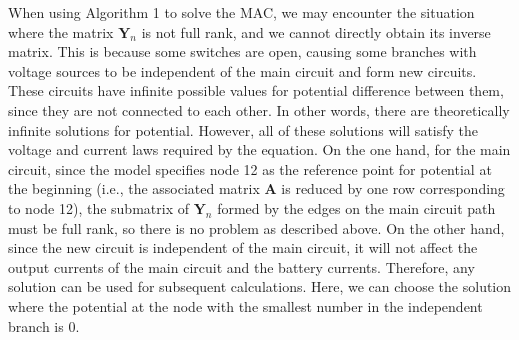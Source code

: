 \documentclass{article}
\begin{document}
When using Algorithm 1 to solve the MAC, we may encounter the situation where the matrix $\bm{Y}_n$ is not full rank, and we cannot directly obtain its inverse matrix.
This is because some switches are open, causing some branches with voltage sources to be independent of the main circuit and form new circuits.
These circuits have infinite possible values for potential difference between them, since they are not connected to each other.
In other words, there are theoretically infinite solutions for potential.
However, all of these solutions will satisfy the voltage and current laws required by the equation.
On the one hand, for the main circuit, since the model specifies node 12 as the reference point for potential at the beginning (i.e., the associated matrix $\bm{A}$ is reduced by one row corresponding to node 12), the submatrix of $\bm{Y}_n$ formed by the edges on the main circuit path must be full rank, so there is no problem as described above.
On the other hand, since the new circuit is independent of the main circuit, it will not affect the output currents of the main circuit and the battery currents.
Therefore, any solution can be used for subsequent calculations.
Here, we can choose the solution where the potential at the node with the smallest number in the independent branch is 0.
\end{document}
